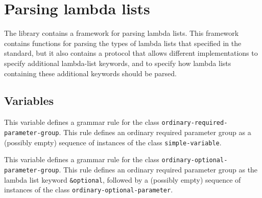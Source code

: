 \chapter{Parsing lambda lists}
\label{chap-user-parsing-lambda-lists}

The \sysname{} library contains a framework for parsing lambda lists.
This framework contains functions for parsing the types of lambda
lists that specified in the \commonlisp{} standard, but it also
contains a protocol that allows different implementations to specify
additional lambda-list keywords, and to specify how lambda lists
containing these additional keywords should be parsed.

\section{Variables}


This variable defines a grammar rule for the class
\texttt{ordinary-required-parameter-group}.  This rule defines an
ordinary required parameter group as a (possibly empty) sequence of
instances of the class \texttt{simple-variable}.


This variable defines a grammar rule for the class
\texttt{ordinary-optional-parameter-group}.  This rule defines an
ordinary required parameter group as the lambda list keyword
\texttt{\&optional}, followed by a (possibly empty) sequence of
instances of the class \texttt{ordinary-optional-parameter}.












